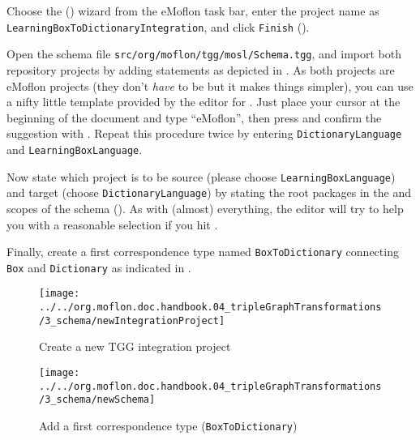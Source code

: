 \begin{stepbystep}

\item Choose the  (\eMoflonCreateNewIntegrationProjectIcon) wizard from the eMoflon task bar, enter the project name as
\texttt{Learning\-Box\-To\-Dictionary\-In\-te\-gra\-tion}, and click \texttt{Finish} ().

\item Open the schema file \texttt{src/org/moflon/tgg/mosl/Schema.tgg}, and import both repository projects by adding  statements as depicted in .
As both projects are eMoflon projects (they don't \emph{have} to be but it makes things simpler), you can use a nifty little template provided by the editor for .
Just place your cursor at the beginning of the document and type \enquote{eMoflon}, then press  and confirm the suggestion with .
Repeat this procedure twice by entering \texttt{Dict\-io\-nary\-Lang\-uage} and \texttt{Lear\-ning\-Box\-Language}.

\item Now state which project is to be source (please choose \texttt{Learning\-Box\-Language}) and target (choose \texttt{Dictionary\-Language}) by stating the root packages in the  and  scopes of the schema ().
As with (almost) everything, the editor will try to help you with a reasonable selection if you hit . 

\item Finally, create a first correspondence type named \texttt{BoxToDictionary} connecting \texttt{Box} and \texttt{Dictionary} as indicated in .
\end{stepbystep}

\begin{figure}[htbp]
\begin{center}
  \texttt{[image: ../../org.moflon.doc.handbook.04\_tripleGraphTransformations/3\_schema/newIntegrationProject]}
  \caption{Create a new TGG integration project}  
  \label{intgPackage}
\end{center}
\end{figure}

\begin{figure}[htbp]
\begin{center}
  \texttt{[image: ../../org.moflon.doc.handbook.04\_tripleGraphTransformations/3\_schema/newSchema]}
  \caption{Add a first correspondence type (\texttt{BoxToDictionary})}  
  \label{newSchema}
\end{center}
\end{figure}
